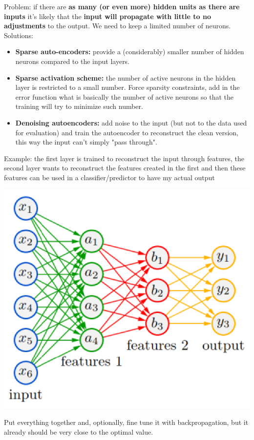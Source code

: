 \begin{itemize}
	\newpage
	
	Problem: if there are \textbf{as many (or even more) hidden units as there are inputs} it's likely that the \textbf{input will propagate with little to no adjustments} to the output. We need to keep a limited number of neurons. Solutions: 
	\begin{itemize}
		\item \textbf{Sparse auto-encoders:} provide a (considerably) smaller number of hidden neurons compared to the input layers. 
		
		\item \textbf{Sparse activation scheme:} the number of active neurons in the hidden layer is restricted to a small number. Force sparsity constraints, add in the error function what is basically the number of active neurons so that the training will try to minimize such number.
		
		\item \textbf{Denoising autoencoders:} add noise to the input (but not to the data used for evaluation) and train the autoencoder to reconstruct the clean version, this way the input can't simply "pass through".
		
	\end{itemize}
	
	Example: the first layer is trained to reconstruct the input through features, the second layer wants to reconstruct the features created in the first and then these features can be used in a classifier/predictor to have my actual output
	\begin{center}
		\includegraphics[width=0.6\columnwidth]{img/NN/autoencoder2}
	\end{center}
	Put everything together and, optionally, fine tune it with backpropagation, but it already should be very close to the optimal value.
\end{itemize}

